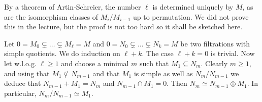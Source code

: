 \documentclass[a4paper,parskip=half,numbers=enddot, DIV=12]{scrreprt}
\begin{document}
\begin{rem}
    \begin{alphanumerate}
    \item {}
        By a theorem of Artin-Schreier, the number $\ell$ is determined uniquely by $M$, as are the isomorphism classes of $M_i/M_{i-1}$ up to permutation. We did not prove this in the lecture, but the proof is not too hard so it shall be sketched here.
        
        Let $0=M_0\subsetneq \ldots\subsetneq M_\ell=M$ and $0=N_0\subsetneq\ldots\subsetneq N_k=M$ be two filtrations with simple quotients. We do induction on $\ell+k$. The case $\ell+k=0$ is trivial. Now let w.l.o.g. $\ell\geq1$ and choose  a minimal $m$ such that $M_1\subseteq N_m$. Clearly $m\geq 1$, and using that $M_1\not\subseteq N_{m-1}$ and that $M_1$ is simple as well as $N_m/N_{m-1}$ we deduce that $N_{m-1}+M_1=N_m$ and $N_{m-1}\cap M_1=0$. Then $N_m\simeq N_{m-1}\oplus M_1$. In particular, $N_m/N_{m-1}\simeq M_1$.
        

\end{alphanumerate}
\end{rem}
\end{document}
